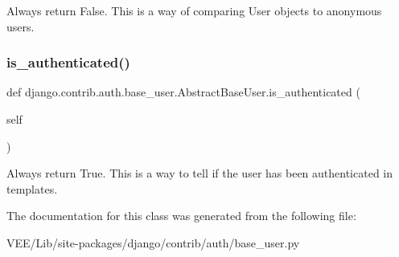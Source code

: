 \begin{DoxyVerb}Always return False. This is a way of comparing User objects to
anonymous users.
\end{DoxyVerb}
 \mbox{\label{classdjango_1_1contrib_1_1auth_1_1base__user_1_1_abstract_base_user_a34ae79343f27c8c9bec05779a9960509}} 
\subsubsection{\texorpdfstring{is\+\_\+authenticated()}{is\_authenticated()}}
{\footnotesize\ttfamily def django.\+contrib.\+auth.\+base\+\_\+user.\+Abstract\+Base\+User.\+is\+\_\+authenticated (\begin{DoxyParamCaption}\item[{}]{self }\end{DoxyParamCaption})}

\begin{DoxyVerb}Always return True. This is a way to tell if the user has been
authenticated in templates.
\end{DoxyVerb}
 

The documentation for this class was generated from the following file\+:\begin{DoxyCompactItemize}
\item 
V\+E\+E/\+Lib/site-\/packages/django/contrib/auth/base\+\_\+user.\+py\end{DoxyCompactItemize}
